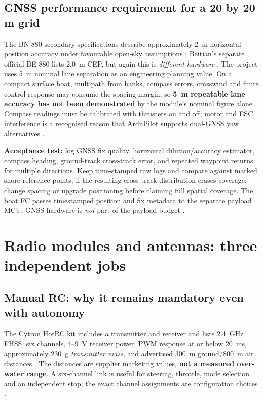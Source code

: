 \subsection{GNSS performance requirement for a 20 by 20 m grid}
The BN-880 secondary specifications describe approximately 2~m horizontal position accuracy under favourable open-sky assumptions \cite{bn880Secondary}; Beitian's separate official BE-880 lists 2.0~m CEP, but again this is \emph{different hardware} \cite{beitianOfficialBE}. The project uses 5~m nominal lane separation as an engineering planning value. On a compact surface boat, multipath from banks, compass errors, crosswind and finite control response may consume the spacing margin, so \textbf{5~m repeatable lane accuracy has not been demonstrated} by the module's nominal figure alone. Compass readings must be calibrated with thrusters on and off; motor and ESC interference is a recognised reason that ArduPilot supports dual-GNSS yaw alternatives \cite{gpsYaw}.\par
\textbf{Acceptance test:} log GNSS fix quality, horizontal dilution/accuracy estimator, compass heading, ground-track cross-track error, and repeated waypoint returns for multiple directions. Keep time-stamped raw logs and compare against marked shore reference points; if the resulting cross-track distribution erases coverage, change spacing or upgrade positioning before claiming full spatial coverage. The boat FC passes timestamped position and fix metadata to the separate payload MCU; GNSS hardware is \emph{not} part of the payload budget \cite{coreDoc,mav,project}.

\section{Radio modules and antennas: three independent jobs}
\label{sec:radio}
\subsection{Manual RC: why it remains mandatory even with autonomy}
The Cytron HotRC kit includes a transmitter and receiver and lists 2.4~GHz FHSS, six channels, 4--9~V receiver power, PWM response at or below 20~ms, approximately 230~g \emph{transmitter mass}, and advertised 300~m ground/800~m air distances \cite{hotrcCurrent}. The distances are supplier marketing values, \textbf{not a measured over-water range}. A six-channel link is useful for steering, throttle, mode selection and an independent stop; the exact channel assignments are configuration choices \cite{rcDoc,failsafes}.

